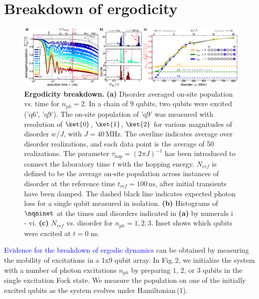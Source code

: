 \section{Breakdown of ergodicity} %
\begin{figure}[t] %
 \centering
 \includegraphics[width=160mm]{./PDF/fig_2.pdf}
 \caption{
 \textbf{Ergodicity breakdown.} \textbf{(a)} Disorder averaged on-site population vs. time for $n_{ph}=2$. In a chain of 9 qubits, two qubits were excited ('q6', 'q9'). The on-site population of 'q9' was measured with resolution of $\ket{0}$, $\ket{1}$, $\ket{2}$ for various magnitudes of disorder $w/J$, with $J=40\,\text{MHz}$. The overline indicates average over disorder realizations, and each data point is the average of 50 realizations. The parameter $\tau_{hop}=\left(2 \pi J \right)^{-1}$ has been introduced to connect the laboratory time $t$ with the hopping energy. $N_{ref}$ is defined to be the average on-site population across instances of disorder at the reference time $t_{ref}=100\,\text{ns}$, after initial transients have been damped. The dashed black line indicates expected photon loss for a single qubit measured in isolation. \textbf{(b)} Histograms of $\nqninet$  at the times and disorders indicated in \textbf{(a)} by numerals i - vi. \textbf{(c)} $N_{ref}$ vs. disorder for $n_{ph}=1, 2, 3$. Inset shows which qubits were excited at $t=0$ ns.}
 \vspace{-1em}
\end{figure}
\textcolor{blue}{ Evidence for the breakdown of ergodic dynamics} can be obtained by measuring the mobility of excitations in a 1x9 qubit array. In Fig.\,2, we initialize the system with a number of photon excitations $n_{ph}$ by preparing $1$, $2$, or $3$ qubits in the single excitation Fock state. We measure the population on one of the initially excited qubits as the system evolves under Hamiltonian\,(1).


